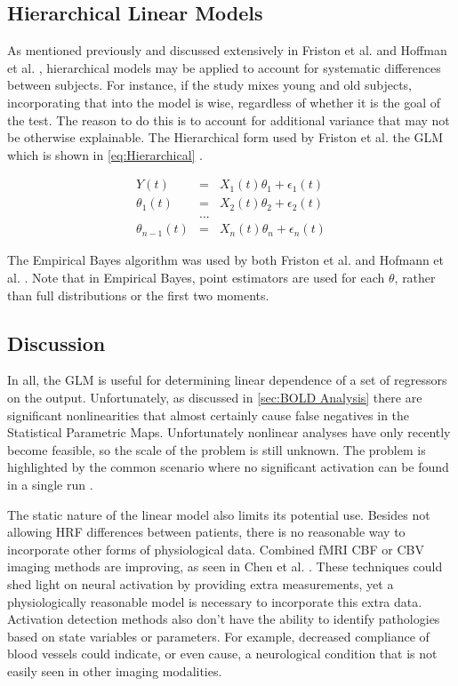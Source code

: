 \subsection{Hierarchical Linear Models}
As mentioned previously and discussed extensively
in Friston et al. \cite{Friston2002a} and Hoffman et al. \cite{Friston2002a},
hierarchical models may be 
applied to account for systematic differences between subjects.
For instance, if the
study mixes young and old subjects, incorporating
that into the model is wise, regardless of whether it is the goal of the test. 
The reason to do this is to account for additional variance that may not
be otherwise explainable.  The Hierarchical form used by
Friston et al. \cite{Friston2002a} the \ac{GLM} which 
is shown in \autoref{eq:Hierarchical} .

\begin{eqnarray}
\label{eq:Hierarchical}
Y(t) & = & X_1(t)\theta_1 + \epsilon_1(t)            \nonumber \\
\theta_1(t) &=& X_2(t)\theta_2 + \epsilon_2(t)     \nonumber \\
 & ... &                                             \nonumber \\
\theta_{n-1}(t)& =& X_n(t)\theta_n + \epsilon_n(t) 
\end{eqnarray}

The Empirical Bayes algorithm was used by both Friston et al. \cite{Friston2002a}
and Hofmann et al. \cite{Hofmann1997}. Note that in Empirical Bayes, 
point estimators are used for each $\theta$, rather than full 
distributions or the first two moments.

\subsection{Discussion}
\label{sec:BackgroundConclusion}
In all, the \ac{GLM} is useful for determining linear 
dependence of a set of regressors on the output. Unfortunately, as discussed in
\autoref{sec:BOLD Analysis} there are significant nonlinearities 
that almost certainly cause false negatives in the Statistical Parametric
Maps. Unfortunately nonlinear analyses have only recently become feasible,
so the scale of the problem is still unknown. The problem is 
highlighted by the common scenario where no significant
activation can be found in a single run \cite{Riera2003, Johnston2007}.  

The static nature of the  linear model also limits its potential use. 
Besides not allowing \ac{HRF} differences between patients, there is no
reasonable way to incorporate other forms of physiological
data. Combined \ac{fMRI} \ac{CBF} or \ac{CBV} imaging methods are improving,
as seen in Chen et al. \cite{Chen2009}. These techniques could shed light on
neural activation by providing extra measurements, yet a 
physiologically reasonable model is necessary to incorporate this extra data.
Activation detection methods also don't have the ability 
to identify pathologies based on state variables or parameters. For
example, decreased compliance of
blood vessels could indicate, or even cause, a neurological condition that 
is not easily seen in other imaging modalities. 

